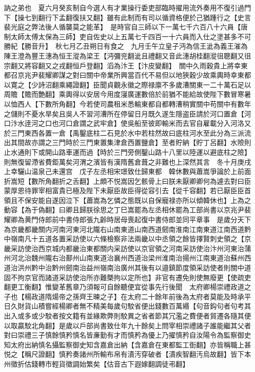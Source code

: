 訥之弟也　夏六月癸亥制自今選人有才業操行委吏部臨時擢用流外奏用不復引過門下【操七到翻行下孟翻復扶又翻】雖有此制而有司以循資格便於己猶踵行之【史言裴光庭之弊法後人循襲莫之能革】　是時官自三師以下一萬七千六百八十六員【唐制太師太傅太保為三師】吏自佐史以上五萬七千四百一十六員而入仕之塗甚多不可勝紀【勝音升】　秋七月乙丑朔日有食之　九月壬午立皇子沔為信王泚為義王漼為陳王澄為豐王潓為恒王漎為梁王【沔彌兖翻泚且禮翻又音此潓胡桂翻漎徂聰翻又徂宗翻又將容翻又之戎翻恒戶登翻】滔為汴王【汴皮變翻】　關中久雨穀貴上將幸東都召京兆尹裴耀卿謀之對曰關中帝業所興當百代不易但以地狹穀少故乘輿時幸東都以寛之【少詩沼翻乘繩證翻】臣聞貞觀永徽之際禄廪不多歲漕關東一二十萬石足以周贍【贍而艶翻】乘輿得以安居今用度寖廣運數倍於前猶不能給故使陛下數冒寒暑以恤西人【下數所角翻】今若使司農租米悉輸東都自都轉漕稍實關中苟關中有數年之儲則不憂水旱矣且吳人不習河漕所在停留日月既久遂生隱盗臣請於河口置倉【河口汴水逹河之口也河口倉謂之武牢倉】使吳船至彼即輸米而去官自雇載分入河洛又於三門東西各置一倉【禹鑿底柱二石見於水中若柱然故曰底柱河水至此分為三派流出其間故亦謂之三門時於三門東置集津倉西置鹽倉】至者貯納【貯丁呂翻】水險則止水通則下或開山路車運而過【時於三門旁側鑿山路十八里以陸運以避底柱之險】則無復留滯省費鉅萬矣河渭之濱皆有漢隋舊倉葺之非難也上深然其言　冬十月庚戌上幸驪山温泉己未還宫　戊子左丞相宋璟致仕歸東都　韓休數與蕭嵩爭論於上前面折嵩短【數所角翻折之舌翻】上頗不悦嵩因乞骸骨上曰朕未厭卿卿何為遽去對曰臣蒙厚恩待罪宰相富貴已極及陛下未厭臣故臣得從容引去【從千容翻】若已厭臣臣首領且不保安能自遂因泣下【蕭嵩為乞憐之態既以自保寵禄亦所以傾韓休也】上為之動容【為于偽翻】曰卿且歸朕徐思之丁巳嵩罷為左丞相休罷為工部尚書以京兆尹裴耀卿為黄門侍郎前中書侍郎張九齡時居母喪起復中書侍郎並同平章事　是歲分天下為京畿都畿關内河南河東河北隴右山南東道山南西道劒南淮南江南東道江南西道黔中嶺南凡十五道各置采訪使以六條檢察非法兩畿以中丞領之餘皆擇賢刺史領之【京畿采訪使治西京城内都畿治東都關内采訪使以京官領之河南采訪使治汴州河東治蒲州河北治魏州隴右治鄯州山南東道治襄州西道治梁州淮南治揚州江南東道治蘇州西道治洪州黔中治黔州劒南治益州嶺南治廣州其後有以邉鎮節度領采訪使者則關中道固不拘京官而諸道采訪使治所亦難槩拘以定所也】非官有遷免則使無廢更【使疏吏翻更工衡翻】惟變革舊章乃須報可自餘聽便宜從事先行後聞　太府卿楊崇禮政道之子也【楊政道隋煬帝之孫齊王暕之子】在太府二十餘年前後為太府者莫能及時承平日久財貨山積嘗經楊卿者無不精美每歲句駮省便出錢數百萬緡【句音鈎句者句考其出入或多或少駮者按文籍有並緣欺弊則駮異之省者節其冗濫之費便者貿遷各隨其便以取贏駮北角翻】是歲以戶部尚書致仕年九十餘矣上問宰相崇禮諸子誰能繼其父者對曰崇禮三子慎餘慎矜慎名皆亷勤有才而慎矜為優上乃擢慎矜自汝陽令為監察御史知太府出納慎名攝監察御史知含嘉倉出納【含嘉倉在東都監工衘翻】亦皆稱職上甚悦之【稱尺證翻】慎矜奏諸州所輸布帛有漬汚穿破者【漬疾智翻汚烏故翻】皆下本州徵折估錢轉市輕貨徵調始繁矣【估音古下遐嫁翻調徒弔翻】

